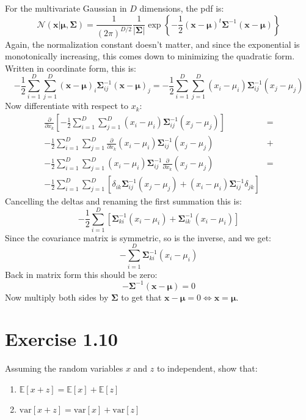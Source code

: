 \documentclass[12pt, a4paper]{article}
\numberwithin{equation}{section}
\begin{document}
For the multivariate Gaussian in $D$ dimensions, the pdf is:
\begin{equation}
\mathcal{N}(\mathbf{x}|\mathbf{\mu},\mathbf{\Sigma})=\frac{1}{(2\pi)^{D/2}}\frac{1}{|\mathbf{\Sigma}|}\exp\left\{-\frac{1}{2}(\mathbf{x}-\mathbf{\mu})^t\mathbf{\Sigma}^{-1}(\mathbf{x}-\mathbf{\mu})\right\}
\end{equation}
Again, the normalization constant doesn't matter, and since the exponential is monotonically increasing, this comes down to minimizing the quadratic form. Written in coordinate form, this is:
\begin{equation}
-\frac{1}{2}\sum_{i=1}^D\sum_{j=1}^D(\mathbf{x}-\mathbf{\mu})_i\mathbf{\Sigma}^{-1}_{ij}(\mathbf{x}-\mathbf{\mu})_j=-\frac{1}{2}\sum_{i=1}^D\sum_{j=1}^D(x_i-\mu_i)\mathbf{\Sigma}^{-1}_{ij}(x_j-\mu_j)
\end{equation}
Now differentiate with respect to $x_k$:
\begin{align}
\frac{\partial}{\partial x_k}\left[-\frac{1}{2}\sum_{i=1}^D\sum_{j=1}^D(x_i-\mu_i)\mathbf{\Sigma}^{-1}_{ij}(x_j-\mu_j)\right]&=\\
-\frac{1}{2}\sum_{i=1}^D\sum_{j=1}^D\frac{\partial}{\partial x_k}(x_i-\mu_i)\mathbf{\Sigma}^{-1}_{ij}(x_j-\mu_j)&+\\
-\frac{1}{2}\sum_{i=1}^D\sum_{j=1}^D(x_i-\mu_i)\mathbf{\Sigma}^{-1}_{ij}\frac{\partial}{\partial x_k}(x_j-\mu_j)&=\\
-\frac{1}{2}\sum_{i=1}^D\sum_{j=1}^D\left[\delta_{ik}\mathbf{\Sigma}^{-1}_{ij}(x_j-\mu_j)+(x_i-\mu_i)\mathbf{\Sigma}^{-1}_{ij}\delta_{jk}\right]
\end{align}
Cancelling the deltas and renaming the first summation this is:
\begin{equation}
-\frac{1}{2}\sum_{i=1}^D\left[\mathbf{\Sigma}^{-1}_{ki}(x_i-\mu_i)+\mathbf{\Sigma}^{-1}_{ik}(x_i-\mu_i)\right]
\end{equation}
Since the covariance matrix is symmetric, so is the inverse, and we get:
\begin{equation}
-\sum_{i=1}^D\mathbf{\Sigma}^{-1}_{ki}(x_i-\mu_i)
\end{equation}
Back in matrix form this should be zero:
\begin{equation}
-\mathbf{\Sigma}^{-1}(\mathbf{x}-\mathbf{\mu})=0
\end{equation}
Now multiply both sides by $\mathbf{\Sigma}$ to get that $\mathbf{x}-\mathbf{\mu}=0\Leftrightarrow\mathbf{x}=\mathbf{\mu}$.

\section{Exercise 1.10}
Assuming the random variables $x$ and $z$ to independent, show that:
\begin{enumerate}
\item $\mathbb{E}[x+z]=\mathbb{E}[x]+\mathbb{E}[z]$
\item $\textrm{var}[x+z]=\textrm{var}[x]+\textrm{var}[z]$
\end{enumerate}
\end{document}
